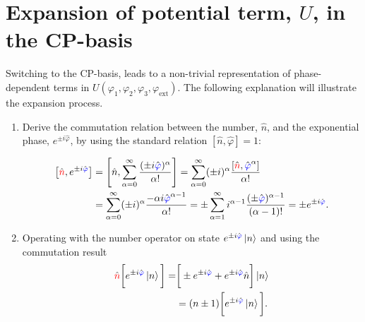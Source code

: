 \section{Expansion of potential term, $U$, in the CP-basis\label{sec:expans-potent-term}}

\noindent Switching to the CP-basis, leads  to a non-trivial representation of phase-dependent
terms in  $ U(\varphi_1,\varphi_2,\varphi_3,\varphi_{\text{ext}})  $.  The following  explanation will  illustrate the
expansion process.

\begin{enumerate}
\item Derive  the commutation relation  between the number, $  \hat{n} $, and  the exponential
  phase,     $    e^{\pm     i\hat{\varphi}}     $,    by     using     the    standard     relation
  $ \left[\hat{n},\hat{\varphi}\right] = 1 $:
 
  {\scriptsize\begin{equation}\label{eq:ab1}
      \begin{aligned}
        \left[\hat{{\color{red}{n}}}, e^{\pm i \hat{\textcolor{blue}{\varphi}}}\right] & =  \left[\hat{n}, \sum_{\alpha = 0}^{\infty} \frac{(\pm i\hat{\textcolor{blue}{\varphi}})^\alpha}{\alpha!}\right] = \sum_{\alpha = 0}^{\infty} (\pm i)^\alpha\frac{\left[\hat{{\color{red}{n}}}, \hat{\textcolor{blue}{\varphi}}^\alpha\right]}{\alpha!}\\
        &  = \sum_{\alpha  = 0}^{\infty}  (\pm i)^\alpha\frac{-\alpha  i\hat{\textcolor{blue}{\varphi}}^{\alpha -  1}}{\alpha!}  =  \pm \sum_{\alpha  =
          1}^{\infty}i^{\alpha  -  1}\frac{(\pm\hat{\textcolor{blue}{\varphi}})^{\alpha  -  1}}{(\alpha   -  1)!}   =  \pm  e^{\pm
          i\hat{\textcolor{blue}{\varphi}}}.
      \end{aligned}
    \end{equation}}

\item Operating with the number operator on state $ e^{\pm i\hat{\textcolor{blue}{\varphi}}}\ket{n} $ and using
  the commutation result \begin{equation}\label{eq:ab2}
    \begin{aligned}
      \hat{{\color{red}{n}}}\bigg[e^{\pm   i\hat{\textcolor{blue}{\varphi}}}\ket{n}\bigg]    =   &    \bigg[\pm   e^{\pm
        i\hat{\textcolor{blue}{\varphi}}}   +  e^{\pm   i\hat{\textcolor{blue}{\varphi}}}\hat{n}\bigg]\ket{n}  \\   &  =   (n\pm
      1)\bigg[e^{\pm i\hat{\textcolor{blue}{\varphi}}}\ket{n}\bigg].
    \end{aligned}
  \end{equation}


\end{enumerate}
